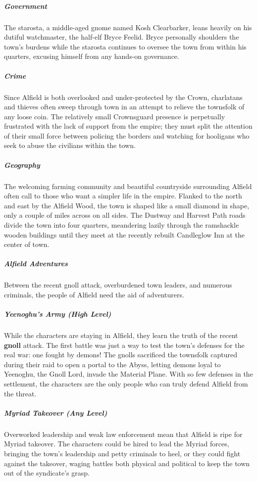 \documentclass[10pt,a4paper,twoside,bg=print,twocolumn,openany,nodeprecatedcode]{dndbook}
\begin{document}
\subparagraph{Government}
The starosta, a middle-aged gnome named Kosh Clearbarker, leans heavily on his dutiful watchmaster, the half-elf Bryce Feelid. Bryce personally shoulders the town's burdens while the starosta continues to oversee the town from within his quarters, excusing himself from any hands-on governance.

\subparagraph{Crime}
Since Alfield is both overlooked and under-protected by the Crown, charlatans and thieves often sweep through town in an attempt to relieve the townsfolk of any loose coin. The relatively small Crownsguard presence is perpetually frustrated with the lack of support from the empire; they must split the attention of their small force between policing the borders and watching for hooligans who seek to abuse the civilians within the town.

\subparagraph{Geography}
The welcoming farming community and beautiful countryside surrounding Alfield often call to those who want a simpler life in the empire. Flanked to the north and east by the Alfield Wood, the town is shaped like a small diamond in shape, only a couple of miles across on all sides. The Dustway and Harvest Path roads divide the town into four quarters, meandering lazily through the ramshackle wooden buildings until they meet at the recently rebuilt Candleglow Inn at the center of town.

\subparagraph{Alfield Adventures}
Between the recent gnoll attack, overburdened town leaders, and numerous criminals, the people of Alfield need the aid of adventurers.

\subparagraph{Yeenoghu's Army (High Level)}
While the characters are staying in Alfield, they learn the truth of the recent \textbf{gnoll} attack. The first battle was just a way to test the town's defenses for the real war: one fought by demons! The gnolls sacrificed the townsfolk captured during their raid to open a portal to the Abyss, letting demons loyal to Yeenoghu, the Gnoll Lord, invade the Material Plane. With so few defenses in the settlement, the characters are the only people who can truly defend Alfield from the threat.

\subparagraph{Myriad Takeover (Any Level)}
Overworked leadership and weak law enforcement mean that Alfield is ripe for Myriad takeover. The characters could be hired to lead the Myriad forces, bringing the town's leadership and petty criminals to heel, or they could fight against the takeover, waging battles both physical and political to keep the town out of the syndicate's grasp.
\end{document}
